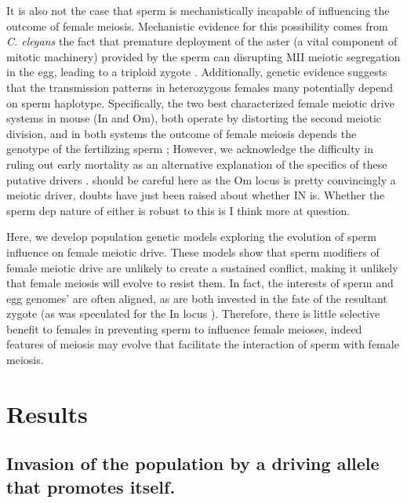 \documentclass[12pt,letterpaper]{article}
\newcommand{\gc}[1]{{ \color{red} #1}}
\begin{document}
It is also not the case that sperm is mechanistically incapable of influencing the outcome of female meiosis.
Mechanistic evidence for this possibility comes from
\emph{C. elegans} the fact that premature deployment of the aster (a vital component of mitotic
machinery) provided by the sperm can disrupting MII meiotic segregation
in the egg, leading to a triploid zygote \citep{McNally2012}. 
Additionally, genetic evidence suggests that the transmission patterns
in heterozygous females many potentially depend on sperm haplotype. 
Specifically, the two best characterized female meiotic drive systems in mouse (In and Om), both operate by distorting the second meiotic division, 
and in both systems the outcome of female meiosis depends the genotype of the fertilizing sperm \citep{Agulnik1993,Wu2005}; 
However,  we acknowledge the difficulty in ruling out early mortality
as an alternative explanation of the 
specifics of these putative drivers \citep[Give page numbers to
discussion of this in][]{Burt2006}. \gc{should be careful here as the
  Om locus is pretty convincingly a meiotic driver, doubts have just
  been raised about whether IN is. Whether the sperm dep nature of
  either is robust to this is I think more at question.}


Here, we develop population genetic models exploring the evolution of sperm influence on female meiotic drive. 
These models show that sperm modifiers of female meiotic drive are
unlikely to create a sustained conflict, making it unlikely that
female meiosis will evolve to resist them.
In fact, the interests of sperm and egg  genomes' are often aligned, as are both invested in the fate of the resultant zygote (as was speculated for the In locus \citep{Pomiankowski1993}).
Therefore, there is little selective benefit to females in preventing sperm to influence female meioses,
	indeed features of meiosis may evolve that facilitate the interaction of sperm with female meiosis. 

\section*{Results}

\subsection*{ Invasion of the population by a driving allele that promotes
itself.}
\end{document}
